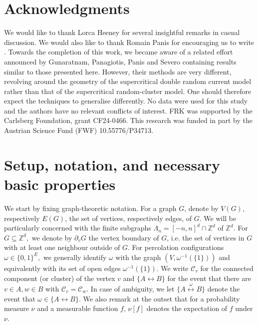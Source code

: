 \documentclass[article,11pt,reqno]{amsart}
\newcommand{\cc}{\leftrightarrow}
\begin{document}
\section*{Acknowledgments}
We would like to thank Lorca Heeney for several insightful remarks in casual discussion. We would also like to thank Romain Panis for encouraging us to write . Towards the completion of this work, we became aware of a related effort announced by Gunaratnam, Panagiotis, Panis and Severo \cite{GPPS} containing results similar to those presented here. However, their methods are very different, revolving around the geometry of the supercritical double random current model rather than that of the supercritical random-cluster model. One should therefore expect the techniques to generalise differently.  No data were used for this study and the authors have no relevant conflicts of interest.   FRK was supported by the Carlsberg Foundation, grant CF24-0466.  This research was funded in part by the Austrian Science Fund (FWF) 10.55776/P34713.



\section{Setup, notation, and necessary basic properties}
We start by fixing graph-theoretic notation. For a graph $G$, denote by $V(G)$, respectively $E(G)$, the set of vertices, respectively edges, of $G$. We will be particularly concerned with the finite subgraphs $\Lambda_n=[-n,n]^d\cap \mathbb{Z}^d$ of $\mathbb{Z}^d.$ For $G\subseteq \mathbb{Z}^d,$ we denote by $\partial_v G$ the vertex boundary of $G$, i.e. the set of vertices in $G$ with at least one neighbour outside of $G$. For percolation configurations $\omega\in \{0,1\}^E,$ we generally identify $\omega$ with the graph $(V,\omega^{-1}(\{1\}))$ and equivalently with its set of open edges $\omega^{-1}(\{1\}).$ We write $\mathcal{C}_v$ for the connected component (or cluster) of the vertex $v$ and $\{A\cc B\}$ for the event that there are $v\in A,w\in B$ with $\mathcal{C}_v=\mathcal{C}_w.$ In case of ambiguity, we let $\{A\overset{\omega}{\longleftrightarrow} B\}$ denote the event that $\omega\in \{A\cc B\}.$ We also remark at the outset that for a probability measure $\nu$ and a measurable function $f$, $\nu[f]$ denotes the expectation of $f$ under $\nu$. 
\end{document}
